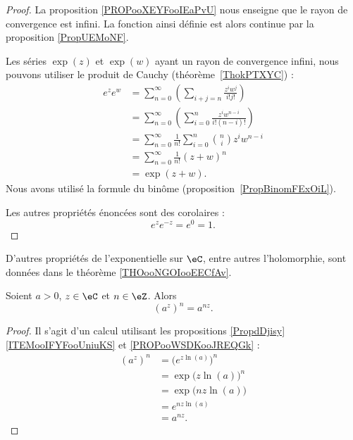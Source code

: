 \begin{proof}
	La proposition \ref{PROPooXEYFooIEaPvU} nous enseigne que le rayon de convergence est infini. La fonction ainsi définie est alors continue par la proposition \ref{PropUEMoNF}.

	Les séries \( \exp(z)\) et \( \exp(w)\) ayant un rayon de convergence infini, nous pouvons utiliser le produit de Cauchy (théorème~\ref{ThokPTXYC}) :
	\begin{subequations}
		\begin{align}
			e^{z} e^{w} & =\sum_{n=0}^{\infty}\left( \sum_{i+j=n}\frac{ z^iw^j }{ i!j! } \right)         \\
			            & =\sum_{n=0}^{\infty}\left( \sum_{i=0}^n\frac{ z^iw^{n-i} }{ i!(n-i)! } \right) \\
			            & =\sum_{n=0}^{\infty}\frac{1}{ n! }\sum_{i=0}^{n}{n\choose i}z^iw^{n-i}         \\
			            & =\sum_{n=0}^{\infty}\frac{1}{ n! }(z+w)^{n}                                    \\
			            & =\exp(z+w).
		\end{align}
	\end{subequations}
	Nous avons utilisé la formule du binôme (proposition~\ref{PropBinomFExOiL}).

	Les autres propriétés énoncées sont des corolaires :
	\begin{equation}
		e^{z} e^{-z}= e^{0}=1.
	\end{equation}
\end{proof}

D'autres propriétés de l'exponentielle sur \( \eC\), entre autres l'holomorphie, sont données dans le théorème \ref{THOooNGOIooEECfAv}.

\begin{lemma}        \label{LEMooTDGKooWdpUTD}
	Soient \( a>0\), \( z\in \eC\) et \( n\in \eZ\). Alors
	\begin{equation}
		(a^z)^n=a^{nz}.
	\end{equation}
\end{lemma}

\begin{proof}
	Il s'agit d'un calcul utilisant les propositions \ref{PropdDjisy}\ref{ITEMooIFYFooUniuKS} et \ref{PROPooWSDKooJREQGk} :
	\begin{subequations}
		\begin{align}
			(a^z)^n & =\big(  e^{z\ln(a)} \big)^n \\
			        & =\exp\big( z\ln(a) \big)^n  \\
			        & =\exp\big( nz\ln(a) \big)   \\
			        & = e^{nz\ln(a)}              \\
			        & =a^{nz}.
		\end{align}
	\end{subequations}
\end{proof}

